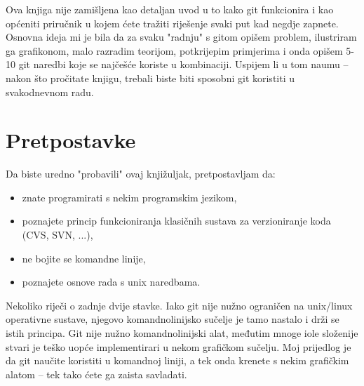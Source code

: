 Ova knjiga nije zamišljena kao detaljan uvod u to kako git funkcionira i kao općeniti priručnik u kojem ćete tražiti riješenje svaki put kad negdje zapnete.
Osnovna ideja mi je bila da za svaku "radnju" s gitom opišem problem, ilustriram ga grafikonom, malo razradim teorijom, potkrijepim primjerima i onda opišem 5-10 git naredbi koje se najčešće koriste u kombinaciji. 
Uspijem li u tom naumu -- nakon što pročitate knjigu, trebali biste biti sposobni git koristiti u svakodnevnom radu. 

\section*{Pretpostavke}

Da biste uredno "probavili" ovaj knjižuljak, pretpostavljam da:

\begin{itemize}
	\item znate programirati s nekim programskim jezikom,
	\item poznajete princip funkcioniranja klasičnih sustava za verzioniranje koda (CVS, SVN, ...),
	\item ne bojite se komandne linije,
	\item poznajete osnove rada s unix naredbama.
\end{itemize}

Nekoliko riječi o zadnje dvije stavke.
Iako git nije nužno ograničen na unix/linux operativne sustave, njegovo komandnolinijsko sučelje je tamo nastalo i drži se istih principa.
Git nije nužno komandnolinijski alat, međutim mnoge iole složenije stvari je teško uopće implementirari u nekom grafičkom sučelju. 
Moj prijedlog je da git naučite koristiti u komandnoj liniji, a tek onda krenete s nekim grafičkim alatom -- tek tako ćete ga zaista savladati.

